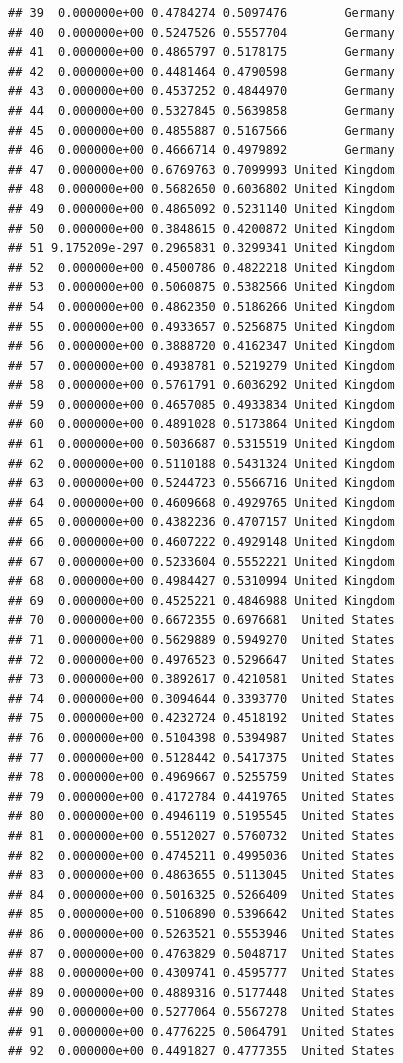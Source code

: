 \documentclass[a4paper,12pt]{article}\usepackage[]{graphicx}\usepackage[]{color}
\makeatletter
\newenvironment{kframe}{%
 \def\at@end@of@kframe{}%
 \ifinner\ifhmode%
  \def\at@end@of@kframe{\end{minipage}}%
  \begin{minipage}{\columnwidth}%
 \fi\fi%
 \def\FrameCommand##1{\hskip\@totalleftmargin \hskip-\fboxsep
 \colorbox{shadecolor}{##1}\hskip-\fboxsep
     \hskip-\linewidth \hskip-\@totalleftmargin \hskip\columnwidth}%
 \MakeFramed {\advance\hsize-\width
   \@totalleftmargin\z@ \linewidth\hsize
   \@setminipage}}%
 {\par\unskip\endMakeFramed%
 \at@end@of@kframe}
\newenvironment{knitrout}{}{} %
\makeatother
\begin{document}
\begin{knitrout}
\begin{kframe}
\begin{verbatim}
## 39  0.000000e+00 0.4784274 0.5097476        Germany
## 40  0.000000e+00 0.5247526 0.5557704        Germany
## 41  0.000000e+00 0.4865797 0.5178175        Germany
## 42  0.000000e+00 0.4481464 0.4790598        Germany
## 43  0.000000e+00 0.4537252 0.4844970        Germany
## 44  0.000000e+00 0.5327845 0.5639858        Germany
## 45  0.000000e+00 0.4855887 0.5167566        Germany
## 46  0.000000e+00 0.4666714 0.4979892        Germany
## 47  0.000000e+00 0.6769763 0.7099993 United Kingdom
## 48  0.000000e+00 0.5682650 0.6036802 United Kingdom
## 49  0.000000e+00 0.4865092 0.5231140 United Kingdom
## 50  0.000000e+00 0.3848615 0.4200872 United Kingdom
## 51 9.175209e-297 0.2965831 0.3299341 United Kingdom
## 52  0.000000e+00 0.4500786 0.4822218 United Kingdom
## 53  0.000000e+00 0.5060875 0.5382566 United Kingdom
## 54  0.000000e+00 0.4862350 0.5186266 United Kingdom
## 55  0.000000e+00 0.4933657 0.5256875 United Kingdom
## 56  0.000000e+00 0.3888720 0.4162347 United Kingdom
## 57  0.000000e+00 0.4938781 0.5219279 United Kingdom
## 58  0.000000e+00 0.5761791 0.6036292 United Kingdom
## 59  0.000000e+00 0.4657085 0.4933834 United Kingdom
## 60  0.000000e+00 0.4891028 0.5173864 United Kingdom
## 61  0.000000e+00 0.5036687 0.5315519 United Kingdom
## 62  0.000000e+00 0.5110188 0.5431324 United Kingdom
## 63  0.000000e+00 0.5244723 0.5566716 United Kingdom
## 64  0.000000e+00 0.4609668 0.4929765 United Kingdom
## 65  0.000000e+00 0.4382236 0.4707157 United Kingdom
## 66  0.000000e+00 0.4607222 0.4929148 United Kingdom
## 67  0.000000e+00 0.5233604 0.5552221 United Kingdom
## 68  0.000000e+00 0.4984427 0.5310994 United Kingdom
## 69  0.000000e+00 0.4525221 0.4846988 United Kingdom
## 70  0.000000e+00 0.6672355 0.6976681  United States
## 71  0.000000e+00 0.5629889 0.5949270  United States
## 72  0.000000e+00 0.4976523 0.5296647  United States
## 73  0.000000e+00 0.3892617 0.4210581  United States
## 74  0.000000e+00 0.3094644 0.3393770  United States
## 75  0.000000e+00 0.4232724 0.4518192  United States
## 76  0.000000e+00 0.5104398 0.5394987  United States
## 77  0.000000e+00 0.5128442 0.5417375  United States
## 78  0.000000e+00 0.4969667 0.5255759  United States
## 79  0.000000e+00 0.4172784 0.4419765  United States
## 80  0.000000e+00 0.4946119 0.5195545  United States
## 81  0.000000e+00 0.5512027 0.5760732  United States
## 82  0.000000e+00 0.4745211 0.4995036  United States
## 83  0.000000e+00 0.4863655 0.5113045  United States
## 84  0.000000e+00 0.5016325 0.5266409  United States
## 85  0.000000e+00 0.5106890 0.5396642  United States
## 86  0.000000e+00 0.5263521 0.5553946  United States
## 87  0.000000e+00 0.4763829 0.5048717  United States
## 88  0.000000e+00 0.4309741 0.4595777  United States
## 89  0.000000e+00 0.4889316 0.5177448  United States
## 90  0.000000e+00 0.5277064 0.5567278  United States
## 91  0.000000e+00 0.4776225 0.5064791  United States
## 92  0.000000e+00 0.4491827 0.4777355  United States
\end{verbatim}
\end{kframe}
\end{knitrout}
\end{document}
